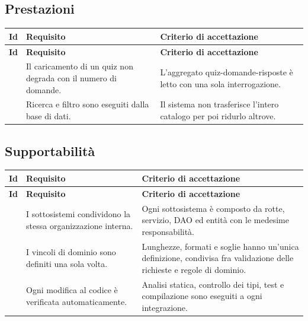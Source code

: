 \subsection{Prestazioni}

\begin{longtable}{@{}l L{5.2cm} L{6.6cm}@{}}
\toprule
\textbf{Id} & \textbf{Requisito} & \textbf{Criterio di accettazione} \\
\midrule
\endfirsthead
\toprule
\textbf{Id} & \textbf{Requisito} & \textbf{Criterio di accettazione} \\
\midrule
\endhead
\bottomrule
\endlastfoot

 &
Il caricamento di un quiz non degrada con il numero di domande. &
L'aggregato quiz-domande-risposte è letto con una sola interrogazione. \\

 &
Ricerca e filtro sono eseguiti dalla base di dati. &
Il sistema non trasferisce l'intero catalogo per poi ridurlo altrove. \\

\end{longtable}

\subsection{Supportabilità}

\begin{longtable}{@{}l L{5.2cm} L{6.6cm}@{}}
\toprule
\textbf{Id} & \textbf{Requisito} & \textbf{Criterio di accettazione} \\
\midrule
\endfirsthead
\toprule
\textbf{Id} & \textbf{Requisito} & \textbf{Criterio di accettazione} \\
\midrule
\endhead
\bottomrule
\endlastfoot

 &
I sottosistemi condividono la stessa organizzazione interna. &
Ogni sottosistema è composto da rotte, servizio, DAO ed entità con le
medesime responsabilità. \\

 &
I vincoli di dominio sono definiti una sola volta. &
Lunghezze, formati e soglie hanno un'unica definizione, condivisa fra
validazione delle richieste e regole di dominio. \\

 &
Ogni modifica al codice è verificata automaticamente. &
Analisi statica, controllo dei tipi, test e compilazione sono eseguiti a
ogni integrazione. \\

\end{longtable}

